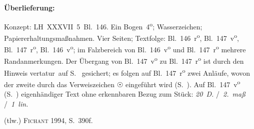 %  
%
%
%
%
%
\frenchspacing
%
\begin{ledgroupsized}[r]{120mm}
\footnotesize
\pstart
\noindent\textbf{Überlieferung:}
\pend
\end{ledgroupsized}
%
\begin{ledgroupsized}[r]{114mm}
\footnotesize
\pstart \parindent -6mm
%
Konzept:
LH~XXXVII~5~Bl.~146. 
Ein Bogen~4\textsuperscript{o};
Wasserzeichen;
Papiererhaltungsmaßnahmen.
Vier Seiten;
Textfolge: 
Bl.~146~r\textsuperscript{o}, Bl.~147~v\textsuperscript{o}, Bl.~147~r\textsuperscript{o}, Bl.~146~v\textsuperscript{o}; im Falzbereich von Bl.~146~v\textsuperscript{o} und Bl.~147~r\textsuperscript{o} mehrere Randanmerkungen.
Der Übergang von Bl.~147~v\textsuperscript{o} zu Bl.~147~r\textsuperscript{o} ist durch den Hinweis \glqq vertatur\grqq\ auf S.~ gesichert; es folgen auf Bl.~147~r\textsuperscript{o} zwei Anläufe, wovon der zweite durch das Verweiszeichen $\astrosun$ eingeführt wird (S.~).
%
Auf Bl.~147~v\textsuperscript{o} (S.~) eigenhändiger Text ohne erkennbaren Bezug zum Stück: \textit{20~D.} \lbrack/\rbrack\ \textit{2.~maß} \lbrack/\rbrack\ \textit{1~lin.}
\pend
\end{ledgroupsized}
%
\begin{ledgroupsized}[r]{114mm}
\footnotesize
\pstart
\parindent -6mm
%
(tlw.) \cite{01056}\textsc{Fichant} 1994, S.~390f.
\pend%
\end{ledgroupsized}
%
%
\count{}%
\count{}%
\count{}
\vspace{5mm}
